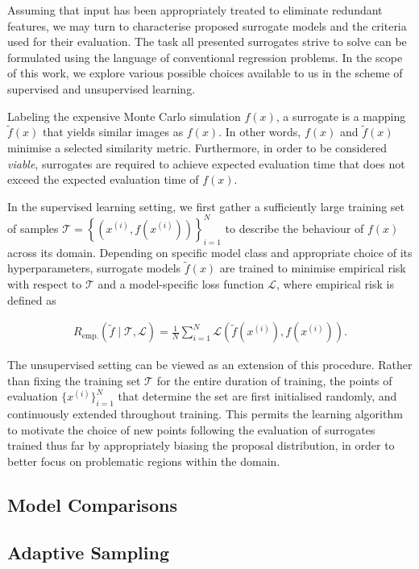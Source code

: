 Assuming that input has been appropriately treated to eliminate redundant
features, we may turn to characterise proposed surrogate models and the criteria
used for their evaluation. The task all presented surrogates strive to solve can be
formulated using the language of conventional regression problems. In the scope
of this work, we explore various possible choices available to us in the
scheme of supervised and unsupervised learning.

Labeling the expensive Monte Carlo simulation $f(x)$, a surrogate is a mapping
$\tilde{f}(x)$ that yields similar images as $f(x)$. In other words, $f(x)$ and
$\tilde{f}(x)$ minimise a selected similarity metric. Furthermore, in order to
be considered \textit{viable}, surrogates are required to achieve expected evaluation time
that does not exceed the expected evaluation time of $f(x)$.

In the supervised learning setting, we first gather a sufficiently large
training set of samples $\mathcal{T}=\left\{\left( x^{(i)},f\left(x^{(i)}\right) \right)\right\}_{i=1}^N$
to describe the behaviour of $f(x)$ across its domain.
Depending on specific model class and appropriate choice of its
hyperparameters, surrogate models $\tilde{f}(x)$ are trained to minimise
empirical risk with respect to $\mathcal{T}$ and a model-specific
loss function $\mathcal{L}$, where empirical risk is defined as

\begin{align}
	R_{\text{emp.}}(\tilde{f}\mid\mathcal{T},\mathcal{L})
	=\frac{1}{N}\sum_{i=1}^N
	\mathcal{L}\left(\tilde{f}(x^{(i)}),f(x^{(i)})\right).
\end{align}

The unsupervised setting can be viewed as an extension of this procedure.
Rather than fixing the training set $\mathcal{T}$ for the entire duration of
training, the points of evaluation $\{x^{(i)}\}_{i=1}^N$ that determine the set
are first initialised randomly, and continuously extended throughout training. This
permits the learning algorithm to motivate the choice of new points following the
evaluation of surrogates trained thus far by appropriately biasing the
proposal distribution, in order to better focus on problematic regions within
the domain.



\subsection{Model Comparisons}
\label{sec:model}


\subsection{Adaptive Sampling}
\label{sec:adaptive}

